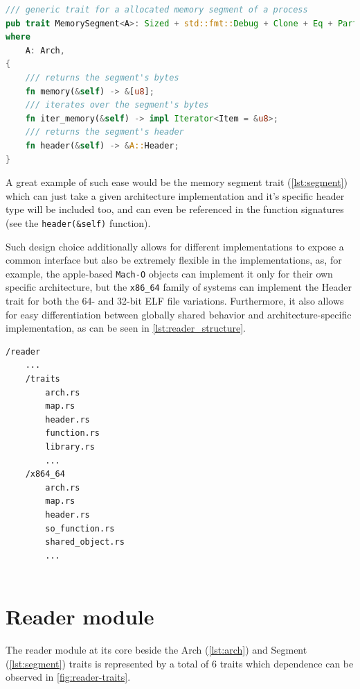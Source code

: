 \begin{lstlisting}[caption=\label{lst:segment}{The memory segment trait}, language=Rust, breaklines=true]
/// generic trait for a allocated memory segment of a process
pub trait MemorySegment<A>: Sized + std::fmt::Debug + Clone + Eq + PartialEq
where
    A: Arch,
{
    /// returns the segment's bytes
    fn memory(&self) -> &[u8];
    /// iterates over the segment's bytes
    fn iter_memory(&self) -> impl Iterator<Item = &u8>;
    /// returns the segment's header
    fn header(&self) -> &A::Header;
}
\end{lstlisting}

A great example of such ease would be the memory segment trait (\autoref{lst:segment}) which can just take a given architecture implementation and it's specific header type will be included too, and can even be referenced in the function signatures (see the \verb|header(&self)| function).

Such design choice additionally allows for different implementations to expose a common interface but also be extremely flexible in the implementations, as, for example, the apple-based \verb|Mach-O| objects can implement it only for their own specific architecture, but the \verb|x86_64| family of systems can implement the Header trait for both the 64- and 32-bit ELF file variations. Furthermore, it also allows for easy differentiation between globally shared behavior and architecture-specific implementation, as can be seen in \autoref{lst:reader_structure}.

\begin{lstlisting}[caption=\label{lst:reader_structure}{Structure of the reader module outlining separate trait and implementation folder}]
/reader
    ...
    /traits
        arch.rs
        map.rs
        header.rs
        function.rs
        library.rs
        ...
    /x864_64
        arch.rs
        map.rs
        header.rs
        so_function.rs
        shared_object.rs
        ...
        
\end{lstlisting}

\section{Reader module}
\label{reader}

The reader module at its core beside the Arch (\autoref{lst:arch}) and Segment (\autoref{lst:segment}) traits is represented by a total of 6 traits which dependence can be observed in \autoref{fig:reader-traits}.

